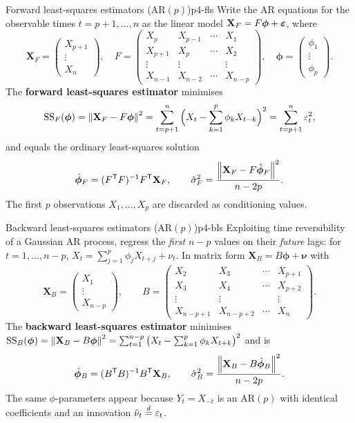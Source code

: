 \begin{definition}{Forward least-squares estimators (AR$(p)$)}{p4-fls}
Write the AR equations for the observable times $t=p+1,\dots,n$ as the linear
model $\mathbf X_F=F\boldsymbol\phi+\boldsymbol{\varepsilon}$, where
\[
\mathbf X_F=\begin{pmatrix}X_{p+1}\\ \vdots\\ X_n\end{pmatrix},
\quad
F=\begin{pmatrix}
X_p & X_{p-1} & \cdots & X_1\\
X_{p+1} & X_p & \cdots & X_2\\
\vdots & \vdots & & \vdots\\
X_{n-1} & X_{n-2} & \cdots & X_{n-p}
\end{pmatrix},
\quad
\boldsymbol\phi=\begin{pmatrix}\phi_1\\ \vdots\\ \phi_p\end{pmatrix}.
\]
The \textbf{forward least-squares estimator} minimises
\[
\mathrm{SS}_F(\boldsymbol\phi)=\left\lVert \mathbf X_F-F\boldsymbol\phi \right\rVert^2
=\sum_{t=p+1}^n\Big(X_t-\sum_{k=1}^p\phi_kX_{t-k}\Big)^2
=\sum_{t=p+1}^n\varepsilon_t^2,
\]
and equals the ordinary least-squares solution
\[
\hat{\boldsymbol\phi}_F=(F^{\mathsf{T}} F)^{-1}F^{\mathsf{T}}\mathbf X_F,
\qquad
\hat\sigma_F^2=\frac{\left\lVert \mathbf X_F-F\hat{\boldsymbol\phi}_F \right\rVert^2}{\,n-2p\,}.
\]
The first $p$ observations $X_1,\dots,X_p$ are discarded as conditioning values.
\end{definition}

\begin{definition}{Backward least-squares estimators (AR$(p)$)}{p4-bls}
Exploiting time reversibility of a Gaussian AR process, regress the
\emph{first} $n-p$ values on their \emph{future} lags: for $t=1,\dots,n-p$,
$X_t=\sum_{j=1}^p\phi_jX_{t+j}+\nu_t$. In matrix form
$\mathbf X_B=B\boldsymbol\phi+\boldsymbol\nu$ with
\[
\mathbf X_B=\begin{pmatrix}X_1\\ \vdots\\ X_{n-p}\end{pmatrix},
\qquad
B=\begin{pmatrix}
X_2 & X_3 & \cdots & X_{p+1}\\
X_3 & X_4 & \cdots & X_{p+2}\\
\vdots & \vdots & & \vdots\\
X_{n-p+1} & X_{n-p+2} & \cdots & X_n
\end{pmatrix}.
\]
The \textbf{backward least-squares estimator} minimises
$\mathrm{SS}_B(\boldsymbol\phi)=\left\lVert \mathbf X_B-B\boldsymbol\phi \right\rVert^2
=\sum_{t=1}^{n-p}\big(X_t-\sum_{k=1}^p\phi_kX_{t+k}\big)^2$ and is
\[
\hat{\boldsymbol\phi}_B=(B^{\mathsf{T}} B)^{-1}B^{\mathsf{T}}\mathbf X_B,
\qquad
\hat\sigma_B^2=\frac{\left\lVert \mathbf X_B-B\hat{\boldsymbol\phi}_B \right\rVert^2}{\,n-2p\,}.
\]
The same $\phi$-parameters appear because $Y_t=X_{-t}$ is an AR$(p)$ with
identical coefficients and an innovation $\tilde\nu_t\overset{d}{=}\varepsilon_t$.
\end{definition}

